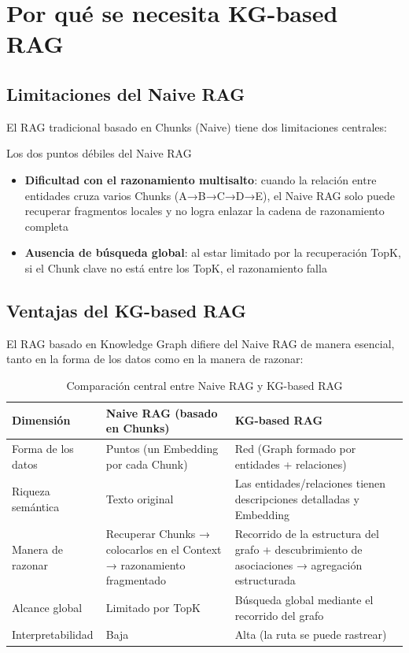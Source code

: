 \section{Por qué se necesita KG-based RAG}

\subsection{Limitaciones del Naive RAG}

El RAG tradicional basado en Chunks (Naive) tiene dos limitaciones centrales:

\begin{importantbox}{Los dos puntos débiles del Naive RAG}
\begin{itemize}
    \item \textbf{Dificultad con el razonamiento multisalto}: cuando la relación entre entidades cruza varios Chunks (A→B→C→D→E), el Naive RAG solo puede recuperar fragmentos locales y no logra enlazar la cadena de razonamiento completa
    \item \textbf{Ausencia de búsqueda global}: al estar limitado por la recuperación TopK, si el Chunk clave no está entre los TopK, el razonamiento falla
\end{itemize}
\end{importantbox}

\subsection{Ventajas del KG-based RAG}

El RAG basado en Knowledge Graph difiere del Naive RAG de manera esencial, tanto en la forma de los datos como en la manera de razonar:

\begin{table}[H]
\centering
\begin{tabular}{p{3cm}p{5cm}p{5cm}}
\toprule
\textbf{Dimensión} & \textbf{Naive RAG (basado en Chunks)} & \textbf{KG-based RAG} \\
\midrule
Forma de los datos & Puntos (un Embedding por cada Chunk) & Red (Graph formado por entidades + relaciones) \\
Riqueza semántica & Texto original & Las entidades/relaciones tienen descripciones detalladas y Embedding \\
Manera de razonar & Recuperar Chunks → colocarlos en el Context → razonamiento fragmentado & Recorrido de la estructura del grafo + descubrimiento de asociaciones → agregación estructurada \\
Alcance global & Limitado por TopK & Búsqueda global mediante el recorrido del grafo \\
Interpretabilidad & Baja & Alta (la ruta se puede rastrear) \\
\bottomrule
\end{tabular}
\caption{Comparación central entre Naive RAG y KG-based RAG}
\end{table}

